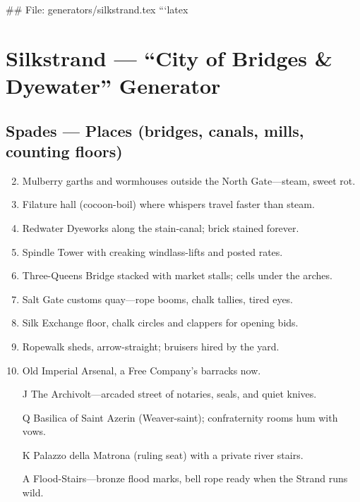 ## File: generators/silkstrand.tex
```latex
\chapter{Silkstrand --- ``City of Bridges \& Dyewater'' Generator}

\section*{Spades --- Places (bridges, canals, mills, counting floors)}
\begin{enumerate}
\setcounter{enumi}{1}
\item Mulberry garths and wormhouses outside the North Gate---steam, sweet rot.
\item Filature hall (cocoon-boil) where whispers travel faster than steam.
\item Redwater Dyeworks along the stain-canal; brick stained forever.
\item Spindle Tower with creaking windlass-lifts and posted rates.
\item Three-Queens Bridge stacked with market stalls; cells under the arches.
\item Salt Gate customs quay---rope booms, chalk tallies, tired eyes.
\item Silk Exchange floor, chalk circles and clappers for opening bids.
\item Ropewalk sheds, arrow-straight; bruisers hired by the yard.
\item Old Imperial Arsenal, a Free Company's barracks now.
\item[J] The Archivolt---arcaded street of notaries, seals, and quiet knives.
\item[Q] Basilica of Saint Azerin (Weaver-saint); confraternity rooms hum with vows.
\item[K] Palazzo della Matrona (ruling seat) with a private river stairs.
\item[A] Flood-Stairs---bronze flood marks, bell rope ready when the Strand runs wild.
\end{enumerate}

